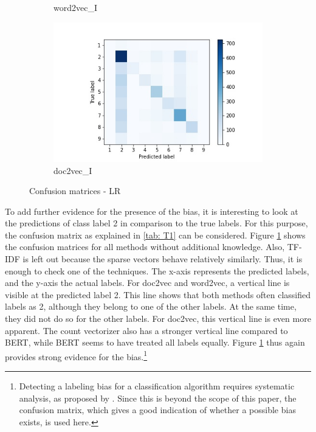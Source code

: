 \documentclass[12pt, a4paper, titlepage]{article}
\begin{document}
\begin{figure}
\begin{subfigure}[b]{0.475\textwidth}
    {{\small word2vec\_I}}    
  \end{subfigure}
  \hfill
  \begin{subfigure}[b]{0.475\textwidth}   
      \centering 
      \includegraphics[width=\textwidth]{cm_doc2vec_without_LR.jpg}
      {{\small doc2vec\_I}}    
  \end{subfigure}
  \caption{\label{fig: F17} Confusion matrices - LR}
\end{figure}

To add further evidence for the presence of the bias, it is interesting to look at the predictions of class label 2 in comparison to the true labels. For this purpose, the confusion matrix as explained in \ref{tab: T1} can be considered. Figure \ref{fig: F17} shows the confusion matrices for all methods without additional knowledge. Also, \ac{TF-IDF} is left out because the sparse vectors behave relatively similarly. Thus, it is enough to check one of the techniques. The x-axis represents the predicted labels, and the y-axis the actual labels. For doc2vec and word2vec, a vertical line is visible at the predicted label 2. This line shows that both methods often classified labels as 2, although they belong to one of the other labels. At the same time, they did not do so for the other labels. For doc2vec, this vertical line is even more apparent. The count vectorizer also has a stronger vertical line compared to BERT, while BERT seems to have treated all labels equally. Figure \ref{fig: F17} thus again provides strong evidence for the bias.\footnote{Detecting a labeling bias for a classification algorithm requires systematic analysis, as proposed by \citet{jiang2020}. Since this is beyond the scope of this paper, the confusion matrix, which gives a good indication of whether a possible bias exists,
is used here.}
\end{document}
